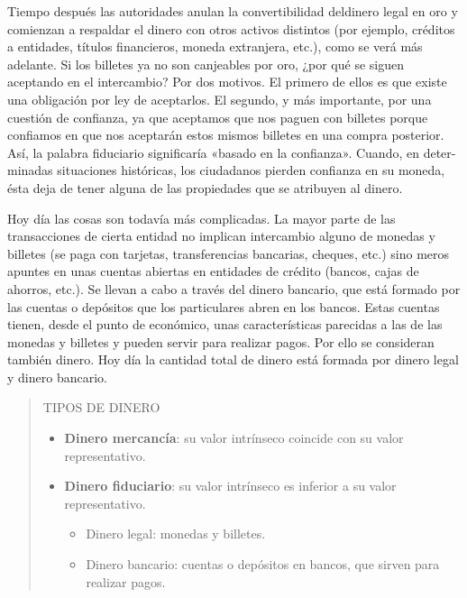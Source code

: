 \documentclass[
]{krantz}
\providecommand{\tightlist}{%
  \setlength{\itemsep}{0pt}\setlength{\parskip}{0pt}}
\begin{document}
Tiempo después las autoridades anulan la convertibilidad deldinero legal en oro y comienzan a respaldar el dinero con otros activos distintos (por ejemplo, créditos a entidades, títulos financieros, moneda extranjera, etc.), como se verá más adelante. Si los billetes ya no son canjeables por oro, ¿por qué se siguen aceptando en el intercambio? Por dos motivos. El primero de ellos es que existe una obligación por ley de aceptarlos. El segundo, y más importante, por una cuestión de conﬁanza, ya que aceptamos que nos paguen con billetes porque conﬁamos en que nos aceptarán estos mismos billetes en una compra posterior. Así, la palabra fiduciario signiﬁcaría «basado en la conﬁanza». Cuando, en deter- minadas situaciones históricas, los ciudadanos pierden conﬁanza en su moneda, ésta deja de tener alguna de las propiedades que se atribuyen al dinero.

Hoy día las cosas son todavía más complicadas. La mayor parte de las transacciones de cierta entidad no implican intercambio alguno de monedas y billetes (se paga con tarjetas, transferencias bancarias, cheques, etc.) sino meros apuntes en unas cuentas abiertas en entidades de crédito (bancos, cajas de ahorros, etc.). Se llevan a cabo a través del dinero bancario, que está formado por las cuentas o depósitos que los particulares abren en los bancos. Estas cuentas tienen, desde el punto de económico, unas características parecidas a las de las monedas y billetes y pueden servir para realizar pagos. Por ello se consideran también dinero. Hoy día la cantidad total de dinero está formada por dinero legal y dinero bancario.

\begin{quote}
TIPOS DE DINERO

\begin{itemize}
\tightlist
\item
  \textbf{Dinero mercancía}: su valor intrínseco coincide con su valor
  representativo.\\
\item
  \textbf{Dinero fiduciario}: su valor intrínseco es inferior a su valor representativo.

  \begin{itemize}
  \tightlist
  \item
    Dinero legal: monedas y billetes.\\
  \item
    Dinero bancario: cuentas o depósitos en bancos, que
    sirven para realizar pagos.
  \end{itemize}
\end{itemize}
\end{quote}
\end{document}
